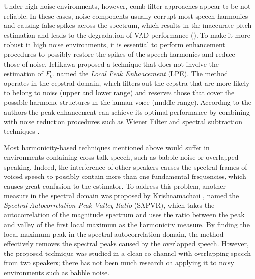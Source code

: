 Under high noise environments, however, comb filter approaches appear to be not reliable.
In these cases, noise components usually corrupt most speech harmonics and causing false spikes across the spectrum, which results in the inaccurate pitch estimation and leads to the degradation of VAD performance ().
To make it more robust in high noise environments, it is essential to perform enhancement procedures to possibly restore the spikes of the speech harmonics and reduce those of noise. Ichikawa \etal \cite{ichikawa2008local} proposed a technique that does not involve the estimation of $F_0$, named the \emph{Local Peak Enhancement} (LPE).
The method operates in the cepstral domain, which filters out the cepstra that are more likely to belong to noise (upper and lower range) and reserves those that cover the possible harmonic structures in the human voice (middle range).
According to the authors the peak enhancement can achieve its optimal performance by combining with noise reduction procedures such as Wiener Filter \cite{papoulis2002probability} and spectral subtraction techniques \cite{boll1979suppression}.

Most harmonicity-based techniques mentioned above would suffer in environments containing cross-talk speech, such as babble noise or overlapped speaking.
Indeed, the interference of other speakers causes the spectral frames of voiced speech to possibly contain more than one fundamental frequencies, which causes great confusion to the estimator.
To address this problem, another measure in the spectral domain was proposed by Krishnamachari \etal \cite{krishnamachari2000spectral}, named the \emph{Spectral Autocorrelation Peak Valley Ratio} (SAPVR), which takes the autocorrelation of the magnitude spectrum and uses the ratio between the peak and valley of the first local maximum as the harmonicity measure.
By finding the local maximum peak in the spectral autocorrelation domain, the method effectively removes the spectral peaks caused by the overlapped speech.
However, the proposed technique was studied in a clean co-channel with overlapping speech from two speakers; there has not been much research on applying it to noisy environments such as babble noise.

